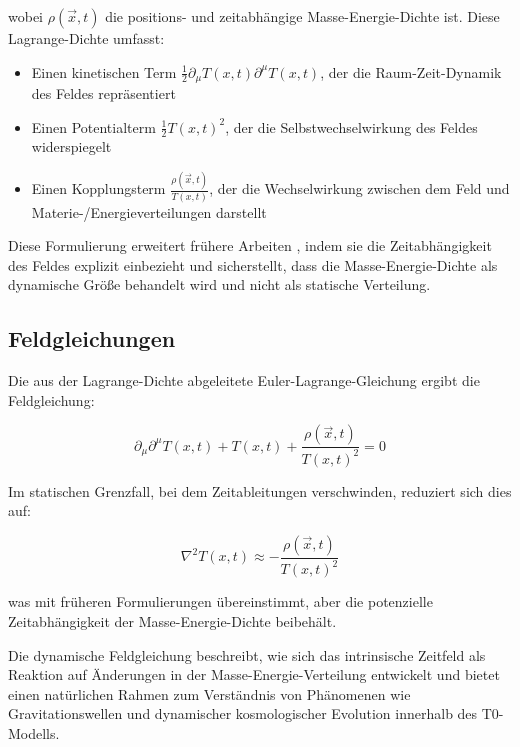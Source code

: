 \documentclass[12pt,a4paper]{article}
\newcommand{\Tfieldt}{T(x,t)}
\newcommand{\vecx}{\vec{x}}
\begin{document}
	wobei $\rho(\vecx,t)$ die positions- und zeitabhängige Masse-Energie-Dichte ist. Diese Lagrange-Dichte umfasst:
	
	\begin{itemize}
		\item Einen kinetischen Term $\frac{1}{2}\partial_{\mu}\Tfieldt\partial^{\mu}\Tfieldt$, der die Raum-Zeit-Dynamik des Feldes repräsentiert
		\item Einen Potentialterm $\frac{1}{2}\Tfieldt^2$, der die Selbstwechselwirkung des Feldes widerspiegelt
		\item Einen Kopplungsterm $\frac{\rho(\vecx,t)}{\Tfieldt}$, der die Wechselwirkung zwischen dem Feld und Materie-/Energieverteilungen darstellt
	\end{itemize}
	
	Diese Formulierung erweitert frühere Arbeiten \cite{pascher_lagrange_2025}, indem sie die Zeitabhängigkeit des Feldes explizit einbezieht und sicherstellt, dass die Masse-Energie-Dichte als dynamische Größe behandelt wird und nicht als statische Verteilung.
	
	\subsection{Feldgleichungen}
	\label{subsec:field_equations}
	
	Die aus der Lagrange-Dichte abgeleitete Euler-Lagrange-Gleichung ergibt die Feldgleichung:
	
	\begin{equation}
		\partial_{\mu}\partial^{\mu}\Tfieldt + \Tfieldt + \frac{\rho(\vecx,t)}{\Tfieldt^2} = 0
		\label{eq:field_equation}
	\end{equation}
	
	Im statischen Grenzfall, bei dem Zeitableitungen verschwinden, reduziert sich dies auf:
	
	\begin{equation}
		\nabla^2 \Tfieldt \approx -\frac{\rho(\vecx,t)}{\Tfieldt^2}
		\label{eq:static_approximation}
	\end{equation}
	
	was mit früheren Formulierungen \cite{pascher_emergente_2025} übereinstimmt, aber die potenzielle Zeitabhängigkeit der Masse-Energie-Dichte beibehält.
	
	Die dynamische Feldgleichung beschreibt, wie sich das intrinsische Zeitfeld als Reaktion auf Änderungen in der Masse-Energie-Verteilung entwickelt und bietet einen natürlichen Rahmen zum Verständnis von Phänomenen wie Gravitationswellen und dynamischer kosmologischer Evolution innerhalb des T0-Modells.
	
\end{document}
